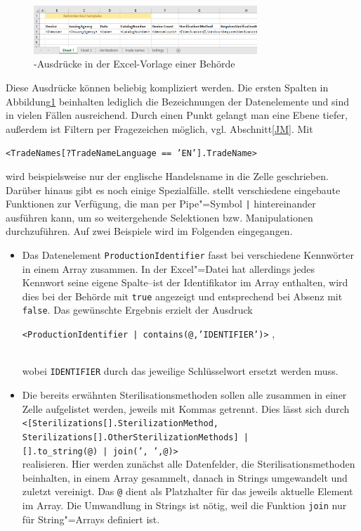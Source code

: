 \begin{figure}[htbp]
 \centering
 \includegraphics[width=0.75\textwidth]{Bilder/JMESPath1}
 \caption[-Ausdrücke in der Excel-Vorlage einer Behörde]{-Ausdrücke in der Excel-Vorlage einer Behörde}
 \label{fig:jms1}
\end{figure}
Diese Ausdrücke können beliebig kompliziert werden. Die ersten Spalten in Abbildung\nbs\ref{fig:jms1} beinhalten lediglich die Bezeichnungen der Datenelemente und sind in vielen Fällen ausreichend. Durch einen Punkt gelangt man eine Ebene tiefer, außerdem ist Filtern per Fragezeichen möglich, vgl. Abschnitt\nbs\ref{JM}. Mit\\
\centerline{\texttt{<TradeNames[?TradeNameLanguage == 'EN'].TradeName>}}
wird beispielsweise nur der englische Handelsname in die Zelle geschrieben.\\
Darüber hinaus gibt es noch einige Spezialfälle.  stellt verschiedene eingebaute Funktionen zur Verfügung, die man per Pipe"=Symbol \texttt{|} hintereinander ausführen kann, um so weitergehende Selektionen bzw. Manipulationen durchzuführen. Auf zwei Beispiele wird im Folgenden eingegangen.
\begin{itemize}
\item Das Datenelement \texttt{ProductionIdentifier} fasst bei  verschiedene Kennwörter in einem Array zusammen. In der Excel"=Datei hat allerdings jedes Kennwort seine eigene Spalte\nbs --\nbs ist der Identifikator im Array enthalten, wird dies bei der Behörde mit \texttt{true} angezeigt und entsprechend bei Absenz mit \texttt{false}. Das gewünschte Ergebnis erzielt der Ausdruck\\
\centerline{\texttt{<ProductionIdentifier | contains(@,'IDENTIFIER')>} ,\phantom{mmmm}}\\
wobei \texttt{IDENTIFIER} durch das jeweilige Schlüsselwort ersetzt werden muss. 
\item Die bereits erwähnten Sterilisationsmethoden sollen alle zusammen in einer Zelle aufgelistet werden, jeweils mit Kommas getrennt. Dies lässt sich durch\\
\phantom{mmmm}\texttt{<[Sterilizations[].SterilizationMethod, }\\
\phantom{mmmm<[}\texttt{Sterilizations[].OtherSterilizationMethods] | }\\
\phantom{mmmm<}\texttt{[].to\_string(@) | join(', ',@)>}\\
realisieren. Hier werden zunächst alle Datenfelder, die Sterilisationsmethoden beinhalten, in einem Array gesammelt, danach in Strings umgewandelt und zuletzt vereinigt. Das \texttt{@} dient als Platzhalter für das jeweils aktuelle Element im Array. Die Umwandlung in Strings ist nötig, weil die Funktion \texttt{join} nur für String"=Arrays definiert ist.
\end{itemize}

